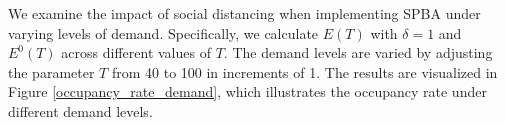 We examine the impact of social distancing when implementing SPBA under varying levels of demand.  Specifically, we calculate $E(T)$ with $\delta = 1$ and $E^{0}(T)$ across different values of $T$. The demand levels are varied by adjusting the parameter $T$ from 40 to 100 in increments of 1. The results are visualized in Figure \ref{occupancy_rate_demand}, which illustrates the occupancy rate under different demand levels.





